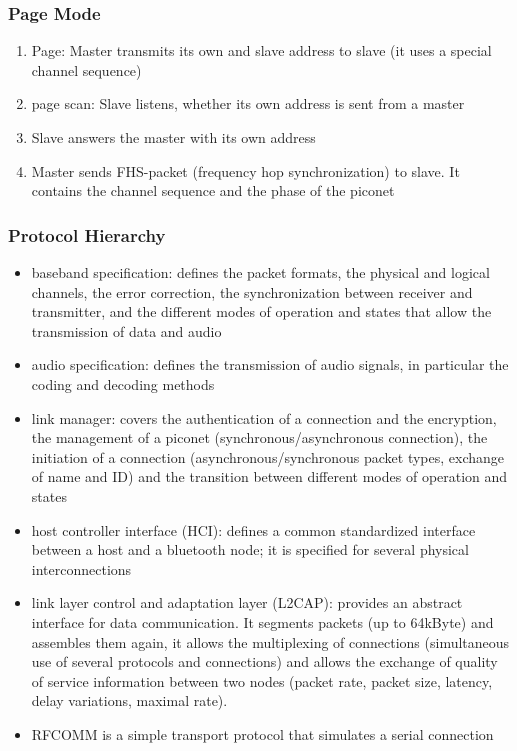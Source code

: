 \subsubsection{Page Mode}
\begin{enumerate}[noitemsep]
\item Page: Master transmits its own and slave address to slave (it uses a special channel sequence)
\item page scan: Slave listens, whether its own address is sent from a master
\item Slave answers the master with its own address
\item Master sends FHS-packet (frequency hop synchronization) to slave. It contains the channel sequence and the phase of the piconet
\end{enumerate}

\subsubsection{Protocol Hierarchy}
\begin{itemize}[noitemsep]
\item baseband specification: defines the packet formats, the physical and logical channels, the error correction, the synchronization between receiver and transmitter, and the different modes of operation and states that allow the transmission of data and audio
\item audio specification: defines the transmission of audio signals, in particular the coding and decoding methods
\item link manager: covers the authentication of a connection and the encryption, the management of a piconet (synchronous/asynchronous connection), the initiation of a connection  (asynchronous/synchronous packet types, exchange of name and ID) and the transition between different modes of operation and states
\item host controller interface (HCI): defines a common standardized interface between a host and a bluetooth node; it is specified for several physical interconnections
\item link layer control and adaptation layer (L2CAP): provides an abstract 
interface for data communication. It segments packets (up to 64kByte) and assembles them again, it allows the multiplexing of connections (simultaneous use of several protocols and connections) and allows the exchange of quality of service information between two nodes (packet rate, packet size, latency, delay variations, maximal rate). 
\item RFCOMM is a simple transport protocol that simulates a serial connection
\end{itemize}

\cleardoublepage